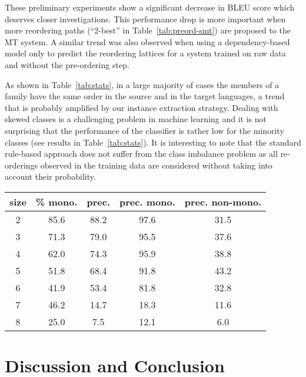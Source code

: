 \documentclass[11pt]{article}
\newcommand{\bleu}{\textsc{BLEU}\xspace}
\begin{document}
These preliminary experiments show a significant decrease in \bleu
score which deserves closer investigations. This performance drop is
more important when more reordering paths (``2-best'' in
Table~\ref{tab:preord-smt}) are proposed to the MT system. A similar
trend was also observed when using a dependency-based model only to
predict the reordering lattices for a system trained on raw data and
without the pre-ordering step.

As shown in Table~\ref{tab:stats}, in a large majority of cases the
members of a family have the same order in the source and in the target
languages, a trend that is probably amplified by our instance extraction strategy.
Dealing with skewed classes is a challenging problem
in machine learning and it is not surprising that the performance of the
classifier is rather low for the minority classes (see results in
Table~\ref{tab:stats}). It is interesting
to note that the standard rule-based approach does not suffer from the class
imbalance problem as all re-orderings observed in the training data
are considered without taking into account their probability.

\begin{table*}[t]
\centering
\begin{tabular}{ccccc}
\toprule
 size & \% mono. & prec. & prec. mono. & prec. non-mono. \\ \midrule
2   &  85.6  &  88.2  &  97.6  &  31.5  \\
3   &  71.3  &  79.0  &  95.5  &  37.6  \\
4   &  62.0  &  74.3  &  95.9  &  38.8  \\
5   &  51.8  &  68.4  &  91.8  &  43.2  \\
6   &  41.9  &  53.4  &  81.8  &  32.8  \\
7   &  46.2  &  14.7  &  18.3  &  11.6  \\
8   &  25.0  &   7.5  &  12.1  &   6.0  \\ 
\bottomrule
\end{tabular}
\caption{\% of family that have the same order in English and German
  (\% mono.), overall prediction performance (prec.) as well as
  precision for monotonic and non-monotonic
  reordering. \label{tab:stats}}
\end{table*}

\section{Discussion and Conclusion}
\end{document}
